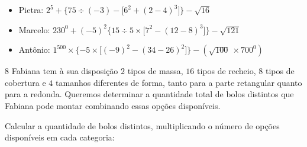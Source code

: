 \begin{itemize}
\item Pietra:
$2^{5} + \{ 75 \div ( - 3 ) - \lbrack 6^{2} + ( 2 - 4 )^{3} \rbrack \} - \sqrt{16}$

\item Marcelo:
$230^{0} + ( - 5)^2 \{ 15 \div 5 \times \lbrack 7^{2} - ( 12 - 8 )^{3} \rbrack \} - \sqrt{121}$

\item Antônio:
$1^{500} \times \{ - 5 \times \lbrack ( - 9 )^{2} - ( 34 - 26 )^{2} \rbrack \} - (\sqrt{100}\  \times 700^{0})$
\end{itemize}



\num{8} Fabiana tem à sua disposição $2$ tipos de massa, $16$ tipos de recheio, $8$ tipos de
cobertura e $4$ tamanhos diferentes de forma, tanto para a parte retangular
quanto para a redonda. Queremos determinar a quantidade total de bolos
distintos que Fabiana pode montar combinando essas opções disponíveis.

Calcular a quantidade de bolos distintos, multiplicando o número de
opções disponíveis em cada categoria: 





